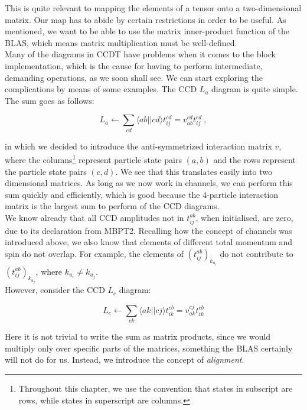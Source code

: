 \documentclass[10pt,twoside]{report}
\begin{document}
	This is quite relevant to mapping the elements of a tensor onto a two-dimensional matrix. Our map has to abide by certain restrictions in order to be useful. As mentioned, we want to be able to use the matrix inner-product function of the BLAS, which means matrix multiplication must be well-defined.\\
	
	Many of the diagrams in CCDT have problems when it comes to the block implementation, which is the cause for having to perform intermediate, demanding operations, as we soon shall see. We can start exploring the complications by means of some examples. The CCD $L_a$ diagram is quite simple. The sum goes as follows:
	
	\begin{equation}
		L_a \leftarrow \sum_{cd}\langle ab||cd\rangle t_{ij}^{cd} = v_{ab}^{cd}t_{ij}^{cd} \:,
	\end{equation}
	
	in which we decided to introduce the anti-symmetrized interaction matrix $v$, where the columns\footnote{Throughout this chapter, we use the convention that states in subscript are rows, while states in superscript are columns.} represent particle state pairs $(a,b)$ and the rows represent the particle state pairs $(c,d)$. We see that this translates easily into two dimensional matrices. As long as we now work in channels, we can perform this sum quickly and efficiently, which is good because the 4-particle interaction matrix is the largest sum to perform of the CCD diagrams.\\
	
	We know already that all CCD amplitudes not in $t_{ij}^{ab}$, when initialised, are zero, due to its declaration from MBPT2. Recalling how the concept of channels was introduced above, we also know that elements of different total momentum and spin do not overlap. For example, the elements of $(t_{ij}^{ab})_{k_{u_i}}$ do not contribute to $(t_{ij}^{ab})_{k_{u_j}}$, where $k_{u_i}\neq k_{u_j}$.\\
	
	However, consider the CCD $L_c$ diagram:
	
	\begin{equation}
	L_c \leftarrow \sum_{ck}\langle ak||cj\rangle t_{ik}^{cb} = v_{ak}^{cj}t_{ik}^{cb}
	\end{equation}
	
	Here it is not trivial to write the sum as matrix products, since we would multiply only over specific parts of the matrices, something the BLAS certainly will not do for us. Instead, we introduce the concept of \emph{alignment}.
	
\end{document}
